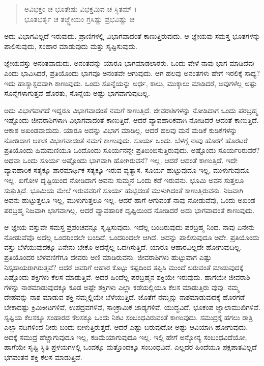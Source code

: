 \begin{verse}
ಅವಿಭಕ್ತಂ ಚ ಭೂತೇಷು ವಿಭಕ್ತಮಿವ ಚ ಸ್ಥಿತಮ್ ।\\ಭೂತಭರ್ತೃ ಚ ತಜ್ಜ್ಞೇಯಂ ಗ್ರಸಿಷ್ಣು ಪ್ರಭವಿಷ್ಣು ಚ 
\end{verse}

{\small ಅದು ವಿಭಾಗವಿಲ್ಲದೆ ಇರುವುದು. ಪ್ರಾಣಿಗಳಲ್ಲಿ ವಿಭಾಗವಾದಂತೆ ಕಾಣುತ್ತಿರುವುದು. ಆ ಜ್ಞೇಯವು ಸಮಸ್ತ ಭೂತಗಳನ್ನು ಪಾಲಿಸುವುದು, ಸಂಹಾರ ಮಾಡುವುದು ಮತ್ತು ಸೃಷ್ಟಿಸುವುದು.}

ಜ್ಞೇಯವಸ್ತು ಅನಂತವಾದುದು. ಅನಂತವನ್ನು ಯಾರೂ ಭಾಗಮಾಡಲಾರರು. ಒಂದು ವೇಳೆ ನಾವು ಭಾಗ ಮಾಡಿದೆವು ಎಂದು ಭಾವಿಸಿದರೆ, ಪ್ರತಿಯೊಂದು ಭಾಗವೂ ಅನಂತವೇ ಆಗುವುದು. ಆಗ ಹಲವು ಅನಂತಗಳು ಹೇಗೆ ಇರಲಿಕ್ಕೆ ಸಾಧ್ಯ? ಇದು ಹಾಸ್ಯಾಸ್ಪದವಾಗಿ ಕಾಣುವುದು. ಒಂದು ಸೊನ್ನೆಯನ್ನು ಅರ್ಧ, ಕಾಲು, ಮುಕ್ಕಾಲು ಮಾಡಿದರೆ, ಅವುಗಳೆಲ್ಲ ಅಷ್ಟು ಸೊನ್ನೆಗಳಾಗುತ್ತವೆ ಹೊರತು, ಸೊನ್ನೆಯ ಅಷ್ಟು ಭಾಗವಾಗುವುದಿಲ್ಲ.

ಅದು ವಿಭಾಗವಾಗದೆ ಇದ್ದರೂ ವಿಭಾಗವಾದಂತೆ ನಮಗೆ ಕಾಣುತ್ತಿದೆ. ಜೀವರಾಶಿಗಳನ್ನು ನೋಡಿದಾಗ ಒಂದು ಪರಬ್ರಹ್ಮ ಇಷ್ಟೊಂದು ಜೀವರಾಶಿಗಳಾಗಿ ವಿಭಾಗವಾದಂತೆ ಕಾಣುತ್ತಿದೆ. ಆದರೆ ವ್ಯಾವಹಾರಿಕವಾಗಿ ನೋಡಿದರೆ ಆದಂತೆ ಕಾಣುತ್ತಿದೆ. ಆಕಾಶ ಅಖಂಡವಾದುದು. ಯಾರೂ ಅದನ್ನು ವಿಭಾಗ ಮಾಡಿಲ್ಲ. ಆದರೆ ಹಲವು ಮನೆ ಮಡಿಕೆ ಕುಡಿಕೆಗಳನ್ನು ನೋಡಿದಾಗ ಆಕಾಶ ವಿಭಾಗವಾದಂತೆ ನಮಗೆ ಕಾಣುವುದು. ಸೂರ್ಯ ಒಂದು. ಬೆಳಗ್ಗೆ ನಾವು ಹೊರಗೆ ಹೊರಟರೆ ಪ್ರತಿಯೊಂದು ಹಿಮಮಣಿಯೂ ಒಂದೊಂದು ಸೂರ್ಯನನ್ನೇ ಪ್ರತಿಬಿಂಬಿಸುತ್ತಿರುವುದು. ಅಷ್ಟೊಂದು ಸೂರ್ಯರಿರುವರೆ? ಅಥವಾ ಒಂದು ಸೂರ್ಯ ಅಷ್ಟೊಂದು ಭಾಗವಾಗಿ ಹೋಗಿರುವನೆ? ಇಲ್ಲ. ಆದರೆ ಆದಂತೆ ಕಾಣುತ್ತಿದೆ. ಇದೇ ವ್ಯಾವಹಾರಿಕ ಸತ್ಯಕ್ಕೂ ಪಾರಮಾರ್ಥಿಕ ಸತ್ಯಕ್ಕೂ ಇರುವ ವ್ಯತ್ಯಾಸ. ಸೂರ್ಯ ಹುಟ್ಟುವುದೂ ಇಲ್ಲ, ಮುಳುಗುವುದೂ ಇಲ್ಲ. ಖಗೋಳ ದೃಷ್ಟಿಯಿಂದ ನೋಡಿದಾಗ ಅವನು ಸುಮ್ಮನೆ ಒಂದು ಕಡೆ ಇರುವನು. ಭೂಮಿ ಅವನ ಸುತ್ತಲೂ ಸುತ್ತುತ್ತಿದೆ. ಭೂಮಿಯ ಮೇಲೆ ಇರುವವರಿಗೆ ಸೂರ್ಯ ಹುಟ್ಟಿದಂತೆ ಮುಳುಗಿದಂತೆ ಕಾಣುತ್ತಿರುವನು. ನಿಜವಾಗಿ ಅವನು ಹುಟ್ಟುತ್ತಲೂ ಇಲ್ಲ, ಮುಳುಗುತ್ತಲೂ ಇಲ್ಲ. ಆದರೆ ಹಾಗೆ ಆಗುವಂತೆ ನಾವು ನೋಡುವೆವು, ಒಂದು ಅಖಂಡ ಪರಬ್ರಹ್ಮ ನಿಜವಾಗಿ ಭಾಗವಾಗಿಲ್ಲ. ಆದರೆ ವ್ಯಾವಹಾರಿಕ ದೃಷ್ಟಿಯಿಂದ ನೋಡಿದರೆ ಅದು ಭಾಗವಾದಂತೆ ಕಾಣುವುದು.

ಆ ಜ್ಞೇಯ ವಸ್ತುವೇ ಸಮಸ್ತ ಪ್ರಪಂಚವನ್ನೂ ಸೃಷ್ಟಿಸುವುದು. ಇದೆಲ್ಲ ಬಂದಿರುವುದು ಪರಬ್ರಹ್ಮ ನಿಂದ. ನಾವು ಏನೇನು ನೋಡುವೆವೊ ಅದೆಲ್ಲ ಒಂದರಿಂದಲೇ ಬಂದಿದೆ, ಒಂದರಿಂದಲೇ ಆಗಿದೆ. ಅದನ್ನು ಪಾಲಿಸುವುದೂ ಅದೇ. ಪ್ರತಿಯೊಂದು ವಸ್ತು ಬೆಳೆಯುವುದಕ್ಕೂ ಏನೇನು ಬೇಕೊ ಅದನ್ನೆಲ್ಲ ಒದಗಿಸುತ್ತಿದೆ. ಯಾರೂ ಆಹಾರವಿಲ್ಲದೇ ಹೋಗುವುದಿಲ್ಲ. ಪ್ರತಿಯೊಂದರ ಬೆಳವಣಿಗೆಗೂ ದೇವರು ಅಣಿ ಮಾಡಿರುವನು. ಜೀವರಾಶಿಗಳು ಹುಟ್ಟುವಾಗ ಎಷ್ಟು ನಿಸ್ಸಹಾಯರಾಗಿರುತ್ತವೆ? ಆದರೆ ಅವರಿಗೆ ಆಹಾರ ಕೊಟ್ಟು ಕಷ್ಟದಿಂದ ತಪ್ಪಿಸಿ ಮುಂದೆ ಬರುವಂತೆ ಮಾಡುವುದಕ್ಕೆ ಎಷ್ಟೊಂದು ಶಕ್ತಿಗಳು ಕೆಲಸ ಮಾಡುತ್ತಿವೆ. ಅದರ ಹಿಂದೆಲ್ಲ ಪರಬ್ರಹ್ಮನ ಶಕ್ತಿಯೇ ಇರುವುದು. ಹಾಗೆಯೇ ಜೀವರಾಶಿ ಗಳನ್ನು ನಾಶಮಾಡುವುದಕ್ಕೂ ಕೂಡ ಅಷ್ಟೇ ಶಕ್ತಿಗಳು ಎಲ್ಲಾ ಕಡೆಯಲ್ಲಿಯೂ ಕೆಲಸ ಮಾಡುತ್ತಿರು ವುವು. ನಮ್ಮ ದೇಹವನ್ನು ನಾಶ ಮಾಡುವ ಶಕ್ತಿ ನಮ್ಮಲ್ಲಿಯೇ ಬೆಳೆಯುತ್ತಿದೆ. ಜೊತೆಗೆ ನಮ್ಮನ್ನು ನಾಶಮಾಡುವುದಕ್ಕೆ ಹೊರಗಡೆ ಬೇಕಾದಷ್ಟು ಕ್ರಿಮಿಕೀಟಗಳಿವೆ, ಉಪದ್ರವಗಳಿವೆ, ಸಾಂಕ್ರಾಮಿಕ ಜಾಡ್ಯಗಳಿವೆ, ಯುದ್ಧವಿದೆ, ಭೂಕಂಪ ಜ್ವಾಲಾಮುಖಿಗಳಿವೆ. ಸೃಷ್ಟಿಯ ಕೆಲಸಕ್ಕೂ ಸಂಹಾರದ ಕೆಲಸಕ್ಕೂ ಒಂದು ನಿಕಟ ಸಂಬಂಧವಿರುವಂತೆ ಕಾಣುವುದು. ಸಮುದ್ರಕ್ಕೆ ಹಗಲು ರಾತ್ರಿ ಎಲ್ಲಾ ನದಿಗಳಿಂದ ನೀರು ಬಂದು ಬೀಳುತ್ತಿರುತ್ತದೆ. ಆದರೆ ಎಷ್ಟು ಬರುವುದೋ ಅಷ್ಟು ಆವಿಯಾಗಿ ಹೋಗುವುದು. ಅದಕ್ಕೆ ಸಮುದ್ರ ಹೆಚ್ಚಾಗುವುದೂ ಇಲ್ಲ, ಕಡಿಮೆಯಾಗುವುದೂ ಇಲ್ಲ. ಇಲ್ಲಿ ಹೇಗೆ ಅನ್ಯೋನ್ಯ ಸಂಬಂಧವಿದೆಯೋ, ಹಾಗೆಯೇ ಸೃಷ್ಟಿ ಸ್ಥಿತಿ ಪ್ರಳಯಗಳಲ್ಲಿ ಒಂದಕ್ಕೂ ಮತ್ತೊಂದಕ್ಕೂ ಸಂಬಂಧವಿದೆ. ಎಲ್ಲದರ ಹಿಂದೆಯೂ ಪಕ್ಷಪಾತವಿಲ್ಲದೆ ಭಗವಂತನ ಶಕ್ತಿ ಕೆಲಸ ಮಾಡುತ್ತಿದೆ.

